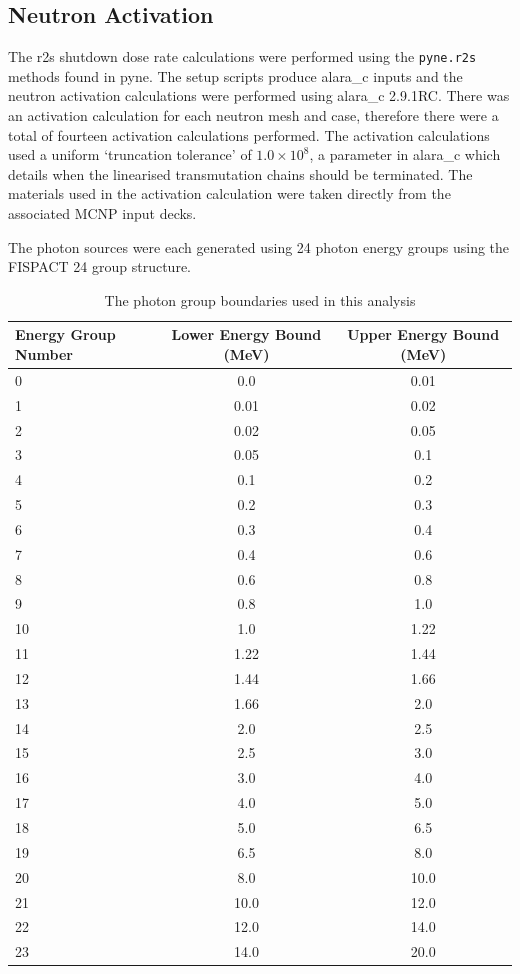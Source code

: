 \documentclass[12pt]{article}
\begin{document}
\subsection{Neutron Activation}
The \gls{r2s} shutdown dose rate calculations were performed using the
\texttt{pyne.r2s} methods found in \gls{pyne}. The setup scripts produce
\gls{alara_c} inputs and the neutron activation calculations were performed
using \gls{alara_c} 2.9.1RC. There was an activation calculation for each 
neutron mesh and case, therefore
there were a total of fourteen activation calculations performed. The activation
calculations used a uniform `truncation tolerance' of $1.0\times10^8$, a parameter in \gls{alara_c}
which details when the linearised transmutation chains should be terminated. The
materials used in the activation calculation were taken directly from the 
associated MCNP input decks. 

The photon sources were each generated using 24 photon
energy groups using the FISPACT 24 group structure.

\begin{table}[ht!]
   \begin{tabular}{| l | c | c |}
      \hline
      Energy Group Number & Lower Energy Bound (MeV) & Upper Energy Bound (MeV) \\
      \hline
      0 & 0.0 & 0.01 \\
      1 & 0.01 & 0.02 \\
      2 & 0.02 & 0.05 \\
      3 & 0.05 & 0.1 \\
      4 & 0.1 & 0.2 \\
      5 & 0.2 & 0.3 \\
      6 & 0.3 & 0.4 \\
      7 & 0.4 & 0.6 \\
      8 & 0.6 & 0.8 \\
      9 & 0.8 & 1.0 \\
      10 & 1.0 & 1.22 \\
      11 & 1.22 & 1.44 \\
      12 & 1.44 & 1.66 \\
      13 & 1.66 & 2.0 \\
      14 & 2.0 & 2.5 \\
      15 & 2.5 & 3.0 \\
      16 & 3.0 & 4.0 \\
      17 & 4.0 & 5.0 \\
      18 & 5.0 & 6.5 \\
      19 & 6.5 & 8.0 \\  
      20 & 8.0 & 10.0 \\
      21 & 10.0 & 12.0 \\
      22 & 12.0 & 14.0 \\
      23 & 14.0 & 20.0 \\  
      \hline
\end{tabular}
\caption{The photon group boundaries used in this analysis}
\label{tab:photon_boundaries}
\end{table}
\end{document}
